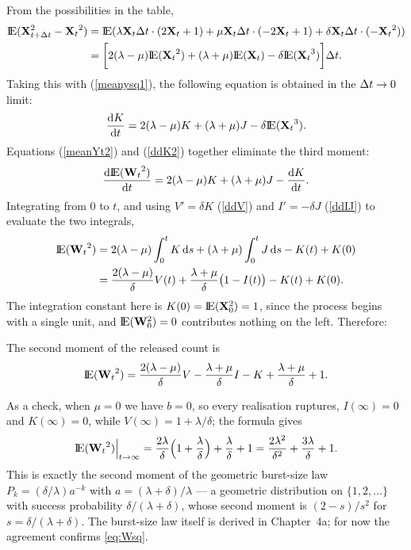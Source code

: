\noindent
From the possibilities in the table,
\begin{align*}
{\rm I}\!{\rm E}({\bf X}_{t+\Delta t}^2 - {{\bf X}_t}^2)
&={\rm I}\!{\rm E}(\lambda {{\bf X}_t}\Delta t\cdot(2{{\bf X}_t}+1) + \mu {{\bf X}_t}\Delta t\cdot(-2{{\bf X}_t}+1) + \delta {{\bf X}_t}\Delta t\cdot(-{{\bf X}_t}^2))\\
&=\bigg[ 2(\lambda-\mu){\rm I}\!{\rm E}({{\bf X}_t}^2) + (\lambda+\mu){\rm I}\!{\rm E}({{\bf X}_t}) - \delta{\rm I}\!{\rm E}({{\bf X}_t}^3) \bigg]\Delta t.
\end{align*}
Taking this with (\ref{meanysq1}), the following equation is obtained in the
$\Delta t\to0$ limit:
\begin{equation}
\label{ddK2}
\displaystyle\frac{{\rm d} K}{{\rm d} t} =2(\lambda-\mu)K+ (\lambda + \mu)J- \delta{\rm I}\!{\rm E}({{\bf X}_t}^3).
\end{equation}
Equations (\ref{meanYt2}) and (\ref{ddK2}) together eliminate the third moment:
\begin{equation}
\label{dWsqOde}
\displaystyle\frac{{\rm d} {\rm I}\!{\rm E}({{\bf W}_t}^2)}{{\rm d} t} = 2(\lambda-\mu)K + (\lambda+\mu)J - \displaystyle\frac{{\rm d} K}{{\rm d} t}.
\end{equation}
Integrating from $0$ to $t$, and using $V'=\delta K$ (\ref{ddV}) and
$I'=-\delta J$ (\ref{ddIJ}) to evaluate the two integrals,
\begin{align*}
{\rm I}\!{\rm E}({{\bf W}_t}^2)
&= 2(\lambda-\mu)\int_0^t K\,{\rm d} s + (\lambda+\mu)\int_0^t J\,{\rm d} s - K(t) + K(0)\\
&= \frac{2(\lambda-\mu)}{\delta}V(t) + \frac{\lambda+\mu}{\delta}\bigl(1-I(t)\bigr) - K(t) + K(0).
\end{align*}
The integration constant here is $K(0)={\rm I}\!{\rm E}({\bf X}_0^2)=1$, since the process
begins with a single unit, and ${\rm I}\!{\rm E}({\bf W}_0^2)=0$ contributes nothing on the
left. Therefore:

\begin{theorem}
\label{thm:Wsq}
The second moment of the released count is
\begin{equation}
\label{eq:Wsq}
{\rm I}\!{\rm E}({{\bf W}_t}^2) = \frac{2(\lambda-\mu)}{\delta} V -\frac{\lambda+\mu}{\delta}I -K +\frac{\lambda+\mu}{\delta}+1.
\end{equation}
\end{theorem}

As a check, when $\mu=0$ we have $b=0$, so every realisation ruptures,
$I(\infty)=0$ and $K(\infty)=0$, while $V(\infty)=1+\lambda/\delta$; the
formula gives
$${\rm I}\!{\rm E}({{\bf W}_t}^2)\Big|_{t\to\infty} = \frac{2\lambda}{\delta}\Bigl(1+\frac{\lambda}{\delta}\Bigr) + \frac{\lambda}{\delta} + 1 = \frac{2\lambda^2}{\delta^2}+\frac{3\lambda}{\delta}+1.$$
This is exactly the second moment of the geometric burst-size law
$P_k=(\delta/\lambda)a^{-k}$ with $a=(\lambda+\delta)/\lambda$ --- a geometric
distribution on $\{1,2,\ldots\}$ with success probability
$\delta/(\lambda+\delta)$, whose second moment is $(2-s)/s^2$ for $s=\delta/(\lambda+\delta)$.
The burst-size law itself is derived in Chapter~4a; for now the agreement
confirms \eqref{eq:Wsq}.

